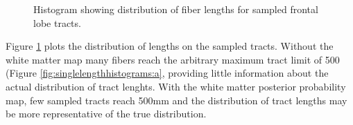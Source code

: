\begin{figure}
  \label{fig:singelengthhistograms}
	\caption{Histogram showing distribution of fiber lengths for sampled frontal lobe tracts.}
\end{figure}

Figure \ref{fig:singelengthhistograms} plots the distribution of lengths on the sampled tracts.  Without the white matter map many fibers reach the arbitrary maximum tract limit of 500 (Figure \ref{fig:singlelengthhistograms:a}, providing little information about the actual distribution of tract lenghts.  With the white matter posterior probability map, few sampled tracts reach 500mm and the distribution of tract lengths may be more representative of the true distribution.


